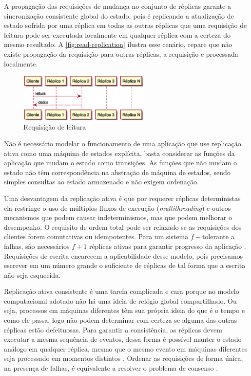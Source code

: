 A propagação das requisições de mudança no conjunto de réplicas garante a sincronização
consistente global do estado, pois é replicando a atualização de estado sofrida por uma
réplica em todas as outras réplicas que uma requisição de leitura pode ser executada
localmente em qualquer réplica com a certeza do mesmo resultado. A
\autoref{fig:read-replication} ilustra esse cenário, repare que não existe propagação da
requisição para outras réplicas, a requisição e processada localmente.

\begin{figure}[htbp]
  \centering
  \includegraphics[width=6.5cm]{conteudo/capitulos/figuras/leitura.eps}
  \caption{Requisição de leitura}
  \label{fig:read-replication}
\end{figure}

Não é necessário modelar o funcionamento de uma aplicação que use replicação ativa como
uma máquina de estados explícita, basta considerar as funções da aplicação que mudam o
estado como transições. As funções que não mudam o estado não têm correspondência na
abstração de máquina de estados, sendo simples consultas ao estado armazenado e não exigem
ordenação.

Uma desvantagem da replicação ativa é que por requerer réplicas deterministas ela
restringe o uso de múltiplos fluxos de execução (\emph{multithreading}) e outros
mecanismos que podem causar indeterminismos, mas que podem melhorar o desempenho. O
requisito de ordem total pode ser relaxado se as requisições dos clientes forem
comutativas ou idempotentes. Para um sistema $f-$tolerante a falhas, são necessários $f +
1$ réplicas ativas para garantir progresso da aplicação \cite{jalote94, lamport10}.
Requisições de escrita encarecem a aplicabilidade desse modelo, pois precisamos escrever
em um número grande o suficiente de réplicas de tal forma que a escrita não seja
esquecida.

Replicação ativa consistente é uma tarefa complicada e cara porque no modelo computacional
adotado não há uma ideia de relógio global compartilhado. Ou seja, processos em máquinas
diferentes têm sua própria ideia do que é o tempo e como ele passa, logo não podem
determinar com certeza se alguma das outras réplicas estão defeituosas. Para garantir a
consistência, as réplicas devem executar a mesma sequência de eventos, dessa forma é
possível manter o estado análogo em qualquer réplica, mesmo que o mesmo evento em máquinas
diferentes seja processado em momentos distintos \cite{tanenbaum07}. Ordenar as
requisições de forma única, na presença de falhas, é equivalente a resolver o problema de
consenso \cite{chandra96}.


